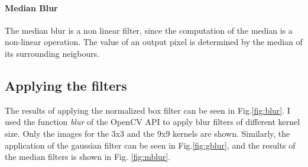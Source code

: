 \documentclass[11pt,a4paper]{article}
\begin{document}
\paragraph{Median Blur}
The median blur is a non linear filter, since the computation of the median is a non-linear operation. The value of an output pixel is determined by the median of its surrounding neigbours.

\subsection{Applying the filters}
The results of applying the normalized box filter can be seen in Fig.\ref{fig:blur}. I used the function \textit{blur} of the OpenCV API to apply blur filters of different kernel size. Only the images for the 3x3 and the 9x9 kernels are shown. Similarly, the application of the gaussian filter can be seen in Fig.\ref{fig:gblur}, and the results of the median filters is shown in Fig. \ref{fig:mblur}.
\end{document}
